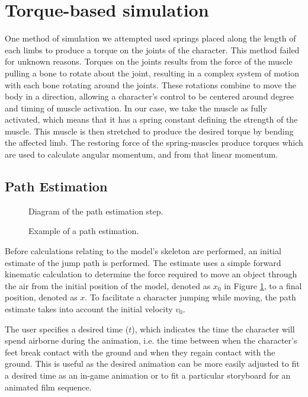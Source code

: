 \section{Torque-based simulation}
One method of simulation we attempted used springs placed along the length of each limbs to produce a torque on the joints of the character.  This method failed for unknown reasons.  Torques on the joints results from the force of the muscle pulling a bone to rotate about the joint, resulting in a complex system of motion with each bone rotating around the joints.  These rotations combine to move the body in a direction, allowing a character's control to be centered around degree and timing of muscle activation. \cite{muscle_based_bipeds}  In our case, we take the muscle as fully activated, which means that it has a spring constant defining the strength of the muscle.  This muscle is then stretched to produce the desired torque by bending the affected limb.  The restoring force of the spring-muscles produce torques which are used to calculate angular momentum, and from that linear momentum.  

\subsection{Path Estimation}

\begin{figure}[ht]
	\centering
	
	\caption[Diagram of path estimation algorithm]{Diagram of the path estimation step.}
	\label{fig:pathEstimate}
\end{figure}

\begin{figure}[ht]
	\label{fig:pathExample}
	\caption[Example of estimated path]{Example of a path estimation.}
\end{figure}
Before calculations relating to the model's skeleton are performed, an initial estimate of the jump path is performed.  The estimate uses a simple forward kinematic calculation to determine the force required to move an object through the air from the initial position of the model, denoted as $x_0$ in Figure \ref{fig:pathEstimate}, to a final position, denoted as $x$.  To facilitate a character jumping while moving, the path estimate takes into account the initial velocity $v_0$.

The user specifies a desired time ($t$), which indicates the time the character will spend airborne during the animation, i.e. the time between when the character's feet break contact with the ground and when they regain contact with the ground.  This is useful as the desired animation can be more easily adjusted to fit a desired time as an in-game animation or to fit a particular storyboard for an animated film sequence.


